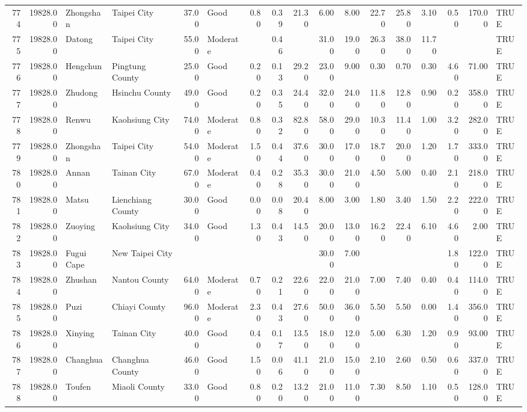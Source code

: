 \begin{table}[ht]
\begin{tabular}{rrllrlrrrrrrrrrrl}
  774 & 19828.00 & Zhongshan & Taipei City & 37.00 & Good & 0.80 & 0.39 & 21.30 & 6.00 & 8.00 & 22.70 & 25.80 & 3.10 & 0.50 & 170.00 & TRUE \\ 
  775 & 19828.00 & Datong & Taipei City & 55.00 & Moderate &  & 0.46 &  & 31.00 & 19.00 & 26.30 & 38.00 & 11.70 &  &  & TRUE \\ 
  776 & 19828.00 & Hengchun & Pingtung County & 25.00 & Good & 0.20 & 0.13 & 29.20 & 23.00 & 9.00 & 0.30 & 0.70 & 0.30 & 4.60 & 71.00 & TRUE \\ 
  777 & 19828.00 & Zhudong & Hsinchu County & 49.00 & Good & 0.20 & 0.35 & 24.40 & 32.00 & 24.00 & 11.80 & 12.80 & 0.90 & 0.20 & 358.00 & TRUE \\ 
  778 & 19828.00 & Renwu & Kaohsiung City & 74.00 & Moderate & 0.80 & 0.32 & 82.80 & 58.00 & 29.00 & 10.30 & 11.40 & 1.00 & 3.20 & 282.00 & TRUE \\ 
  779 & 19828.00 & Zhongshan & Taipei City & 54.00 & Moderate & 1.50 & 0.44 & 37.60 & 30.00 & 17.00 & 18.70 & 20.00 & 1.20 & 1.70 & 333.00 & TRUE \\ 
  780 & 19828.00 & Annan & Tainan City & 67.00 & Moderate & 0.40 & 0.28 & 35.30 & 30.00 & 21.00 & 4.50 & 5.00 & 0.40 & 2.10 & 218.00 & TRUE \\ 
  781 & 19828.00 & Matsu & Lienchiang County & 30.00 & Good & 0.00 & 0.08 & 20.40 & 8.00 & 3.00 & 1.80 & 3.40 & 1.50 & 2.20 & 222.00 & TRUE \\ 
  782 & 19828.00 & Zuoying & Kaohsiung City & 34.00 & Good & 1.30 & 0.43 & 14.50 & 20.00 & 13.00 & 16.20 & 22.40 & 6.10 & 4.60 & 2.00 & TRUE \\ 
  783 & 19828.00 & Fugui Cape & New Taipei City &  &  &  &  &  & 30.00 & 7.00 &  &  &  & 1.80 & 122.00 & TRUE \\ 
  784 & 19828.00 & Zhushan & Nantou County & 64.00 & Moderate & 0.70 & 0.21 & 22.60 & 22.00 & 21.00 & 7.00 & 7.40 & 0.40 & 0.40 & 114.00 & TRUE \\ 
  785 & 19828.00 & Puzi & Chiayi County & 96.00 & Moderate & 2.30 & 0.43 & 27.60 & 50.00 & 36.00 & 5.50 & 5.50 & 0.00 & 1.40 & 356.00 & TRUE \\ 
  786 & 19828.00 & Xinying & Tainan City & 40.00 & Good & 0.40 & 0.17 & 13.50 & 18.00 & 12.00 & 5.00 & 6.30 & 1.20 & 0.90 & 93.00 & TRUE \\ 
  787 & 19828.00 & Changhua & Changhua County & 46.00 & Good & 1.50 & 0.06 & 41.10 & 21.00 & 15.00 & 2.10 & 2.60 & 0.50 & 0.60 & 337.00 & TRUE \\ 
  788 & 19828.00 & Toufen & Miaoli County & 33.00 & Good & 0.80 & 0.20 & 13.20 & 21.00 & 11.00 & 7.30 & 8.50 & 1.10 & 0.50 & 128.00 & TRUE \\ 

\end{tabular}
\end{table}
